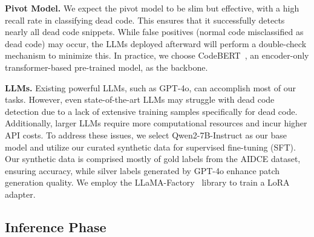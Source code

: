 \documentclass[11pt]{article}
\begin{document}
\textbf{Pivot Model. }
We expect the pivot model to be slim but effective, with a high recall rate in classifying dead code. This ensures that it successfully detects nearly all dead code snippets. While false positives (normal code misclassified as dead code) may occur, the LLMs deployed afterward will perform a double-check mechanism to minimize this. In practice, we choose CodeBERT~\cite{feng2020codebert}, an encoder-only transformer-based pre-trained model, as the backbone.

\textbf{LLMs. }
Existing powerful LLMs, such as GPT-4o, can accomplish most of our tasks. However, even state-of-the-art LLMs may struggle with dead code detection due to a lack of extensive training samples specifically for dead code. Additionally, larger LLMs require more computational resources and incur higher API costs. To address these issues, we select Qwen2-7B-Instruct as our base model and utilize our curated synthetic data for supervised fine-tuning (SFT). Our synthetic data is comprised mostly of gold labels from the AIDCE dataset, ensuring accuracy, while silver labels generated by GPT-4o enhance patch generation quality. We employ the LLaMA-Factory~\cite{zheng2024llamafactory} library to train a LoRA~\cite{hulora} adapter.


\subsection{Inference Phase}

\end{document}
